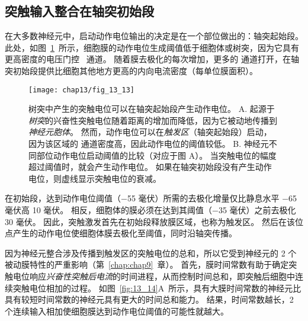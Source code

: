 \subsection{突触输入整合在轴突初始段}

在大多数神经元中，启动动作电位输出的决定是在一个部位做出的：轴突起始段。
此处，如图~\ref{fig:13_13}~所示，细胞膜的动作电位生成阈值低于细胞体或树突，因为它具有更高密度的电压门控~ 通道。
随着膜去极化的每次增加，更多的  通道打开，在轴突初始段提供比细胞其他地方更高的内向电流密度（每单位膜面积）。


\begin{figure}[htbp]
	\centering
	\texttt{[image: chap13/fig\_13\_13]}
	\caption{树突中产生的突触电位可以在轴突起始段产生动作电位\cite{eckert1988propagation}。
		A. 起源于\textit{树突}的兴奋性突触电位随着距离的增加而降低，因为它被动地传播到\textit{神经元胞体}。
		然而，动作电位可以在\textit{触发区}（轴突起始段）启动，因为该区域的  通道密度高，因此动作电位的阈值较低。
		B. 神经元不同部位动作电位启动阈值的比较（对应于图 A）。
		当突触电位的幅度超过阈值时，就会产生动作电位。
		如果在轴突初始段没有产生动作电位，则虚线显示突触电位的衰减。}
	\label{fig:13_13}
\end{figure}


在初始段，达到动作电位阈值（−55 毫伏）所需的去极化增量仅比静息水平 −65 毫伏高 10 毫伏。
相反，细胞体的膜必须在达到其阈值（−35 毫伏）之前去极化 30 毫伏。
因此，突触激发首先在初始段释放膜区域，也称为触发区。
然后在该位点产生的动作电位使细胞体膜去极化至阈值，同时沿轴突传播。


因为神经元整合涉及传播到触发区的突触电位的总和，所以它受到神经元的 2 个被动膜特性的严重影响（第~\ref{chap:chap9}~章）。
首先，膜时间常数有助于确定突触电位响应\textit{兴奋性突触后电流}的时间进程，从而控制时间总和，即突触后细胞中连续突触电位相加的过程。
如图~\ref{fig:13_14}A~所示，具有大膜时间常数的神经元比具有较短时间常数的神经元具有更大的时间总和能力。
结果，时间常数越长，2 个连续输入相加使细胞膜达到动作电位阈值的可能性就越大。


